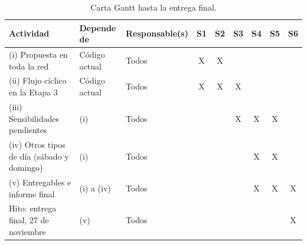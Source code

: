 \begin{table}[H]
\centering
\small
\begin{tabular}{p{4.3cm}p{2.6cm}p{2.3cm}cccccc}
\toprule
Actividad & Depende de & Responsable(s) & S1 & S2 & S3 & S4 & S5 & S6 \\
\midrule
(i) Propuesta en toda la red & Código actual & Todos & X & X & & & & \\
(ii) Flujo cíclico en la Etapa 3 & Código actual & Todos & X & X & X & & & \\
(iii) Sensibilidades pendientes & (i) & Todos & & & X & X & X & \\
(iv) Otros tipos de día (sábado y domingo) & (i) & Todos & & & & X & X & \\
(v) Entregables e informe final & (i) a (iv) & Todos & & & & X & X & X \\
Hito: entrega final, 27 de noviembre & (v) & Todos & & & & & & X \\
\bottomrule
\end{tabular}
\caption{Carta Gantt hasta la entrega final.}
\label{tab:gantt-informe2}
\end{table}
